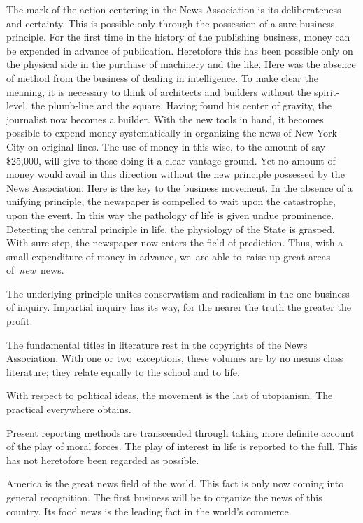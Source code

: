 \documentclass[twoside,symmetric,nobib,justified]{tufte-book}
\begin{document}
The mark of the action centering in the News Association is its
deliberateness and certainty. This is possible only through the
possession of a sure business principle. For the first time in the
history of the publishing business, money can be expended in advance of
publication. Heretofore this has been possible only on the physical side
in the purchase of machinery and the like. Here was the absence of
method from the business of dealing in intelligence. To make clear the
meaning, it is necessary to think of architects and builders without the
spirit-level, the plumb-line and the square. Having found his center of
gravity, the journalist now becomes a builder. With the new tools in
hand, it becomes possible to expend money systematically in organizing
the news of New York City on original lines. The use of money in this
wise, to the amount of say \$25,000, will give to those doing it a clear
vantage ground. Yet no amount of money would avail in this direction
without the new principle possessed by the News Association. Here is the
key to the business movement. In the absence of a unifying principle,
the newspaper is compelled to wait upon the catastrophe, upon the event.
In this way the pathology of life is given undue prominence. Detecting
the central principle in life, the physiology of the State is grasped.
With sure step, the newspaper now enters the field of prediction. Thus,
with a small expenditure of money in advance, we~are able to~raise up
great areas of~\emph{new~}news.~

The underlying principle unites conservatism and radicalism in the one
business of inquiry. Impartial inquiry has its way, for the nearer the
truth the greater the profit.~

The fundamental titles in literature rest in the copyrights of the News
Association. With one or two~exceptions, these volumes are by no means
class literature; they relate equally to the school and to life.~

\enlargethispage{\baselineskip}

With respect to political ideas, the movement is the last of utopianism.
The practical everywhere obtains.~

Present reporting methods are transcended through taking more definite
account of the play of moral forces. The play of interest in life is
reported to the full. This has not heretofore been regarded as
possible.~

America is the great news field of the world. This fact is only now
coming into general recognition. The first business will be to organize
the news of this country. Its food news is the leading fact in the
world's commerce.~
\end{document}
